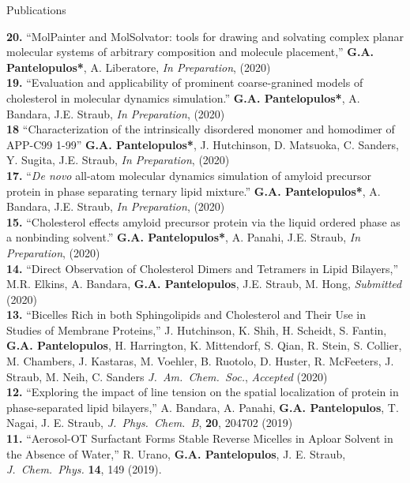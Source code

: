 \documentclass[a4paper]{article}
\def\jpcb{\it J.~Phys.~Chem.~B}
\def\jcp{\it J.~Chem.~Phys.}
\def\jacs{\it J.~Am.~Chem.~Soc.}
\def\jpcb{\it J.~Phys.~Chem.~B}
\begin{document}
\pagebreak
\begin{rubrique}{Publications}
\end{rubrique}
{\bf 20.} ``MolPainter and MolSolvator: tools for drawing and solvating complex planar molecular systems of arbitrary composition and molecule placement,'' \textbf{G.A. Pantelopulos*}, A. Liberatore, {\it In Preparation}, (2020)\\
{\bf 19.} ``Evaluation and applicability of prominent coarse-granined models of cholesterol in molecular dynamics simulation.'' \textbf{G.A. Pantelopulos*}, A. Bandara, J.E. Straub, {\it In Preparation}, (2020)\\
{\bf 18} ``Characterization of the intrinsically disordered monomer and homodimer of APP-C99 1-99'' \textbf{G.A. Pantelopulos*}, J. Hutchinson, D. Matsuoka, C. Sanders, Y. Sugita, J.E. Straub, {\it In Preparation}, (2020)\\
{\bf 17.} ``{\it De novo} all-atom molecular dynamics simulation of amyloid precursor protein in phase separating ternary lipid mixture.'' \textbf{G.A. Pantelopulos*}, A. Bandara, J.E. Straub, {\it In Preparation}, (2020)\\
{\bf 15.} ``Cholesterol effects amyloid precursor protein via the liquid ordered phase as a nonbinding solvent.'' \textbf{G.A. Pantelopulos*}, A. Panahi, J.E. Straub, {\it In Preparation}, (2020)\\
{\bf 14.} ``Direct Observation of Cholesterol Dimers and Tetramers in Lipid Bilayers,''  M.R. Elkins, A. Bandara, {\bf G.A. Pantelopulos}, J.E. Straub, M. Hong, {\it Submitted} (2020)\\
{\bf 13.} ``Bicelles Rich in both Sphingolipids and Cholesterol and Their Use in Studies of Membrane Proteins,''  J. Hutchinson, K. Shih, H. Scheidt, S. Fantin,  \textbf{G.A. Pantelopulos}, H. Harrington, K. Mittendorf, S. Qian, R. Stein, S. Collier, M. Chambers, J. Kastaras, M. Voehler, B. Ruotolo, D. Huster, R. McFeeters, J. Straub, M. Neih, C. Sanders {\jacs}, {\it Accepted} (2020)\\
{\bf 12.} ``Exploring the impact of line tension on the spatial localization of protein in phase-separated lipid bilayers,''  A. Bandara, A. Panahi, \textbf{G.A. Pantelopulos}, T. Nagai, J. E. Straub, {\jpcb}, {\bf 20}, 204702 (2019)\\
{\bf 11.} ``Aerosol-OT Surfactant Forms Stable Reverse Micelles in Aploar Solvent in the Absence of Water,'' R. Urano, \textbf{G.A. Pantelopulos}, J. E. Straub, {\jcp} {\bf 14}, 149 (2019). \\
\end{document}

